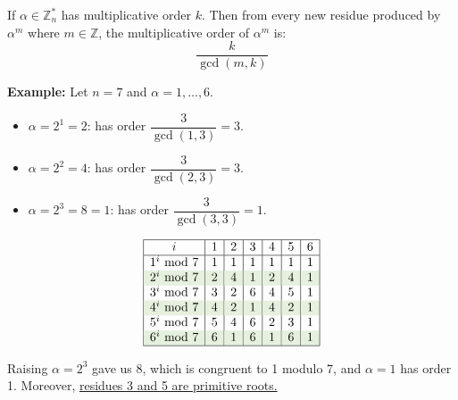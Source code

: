     \begin{theo}

        \label{theo:mult_order_powers}
            
        If $\alpha \in \mathbb{Z}_n^*$ has multiplicative order $k$. Then from every new residue produced by
         $\alpha^m$ where $m \in \mathbb{Z}$, the multiplicative order of $\alpha^m$ is:
        \[\dfrac{k}{\gcd(m, k)}\]
    \end{theo}
    \textbf{Example:} Let $n=7$ and $\alpha=1,\dots,6$.\\
    \begin{minipage}{0.6\textwidth}
        \noindent
        \begin{itemize}
            \item $\alpha=2^1=2$: has order $\dfrac{3}{\gcd(1,3)}=3$.
            \item $\alpha=2^2=4$: has order $\dfrac{3}{\gcd(2,3)}=3$.
            \item $\alpha=2^3=8=1$: has order $\dfrac{3}{\gcd(3,3)}=1$.
        \end{itemize}
        \end{minipage}
    \begin{minipage}{0.4\textwidth}
        \[
        \begin{array}{|c|c|c|c|c|c|c|}
        \hline
        i & 1 & 2 & 3 & 4 & 5 & 6 \\
        \hline
        1^i \text{ mod } 7 & 1 & 1 & 1 & 1 & 1 & 1 \\
        \rowcolor{OliveGreen!10}2^i \text{ mod } 7 & 2 & 4 & 1 & 2 & 4 & 1 \\
        3^i \text{ mod } 7 & 3 & 2 & 6 & 4 & 5 & 1 \\
        \rowcolor{OliveGreen!10}4^i \text{ mod } 7 & 4 & 2 & 1 & 4 & 2 & 1 \\
        5^i \text{ mod } 7 & 5 & 4 & 6 & 2 & 3 & 1 \\
        \rowcolor{OliveGreen!10}6^i \text{ mod } 7 & 6 & 1 & 6 & 1 & 6 & 1 \\
        \hline
        \end{array}
        \]
        \end{minipage}

        \vspace{1em}
        \noindent
        Raising $\alpha=2^3$ gave us 8, which is congruent to 1 modulo 7, and $\alpha=1$ has order 1. Moreover,
        \underline{residues 3 and 5 are primitive roots.}\\

